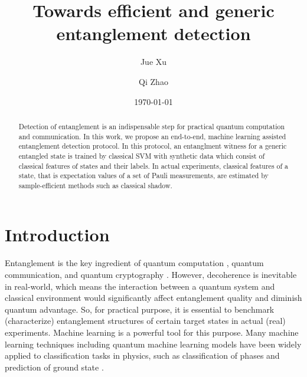 \documentclass[
reprint,
aps,
pra,
floatfix,
]{revtex4-2}
\theoremstyle{plain}
\theoremstyle{definition}
\begin{document}
\title{Towards efficient and generic entanglement detection}
\author{Jue Xu}
\author{Qi Zhao}
\date{\today}
\begin{abstract}
	Detection of entanglement is an indispensable step for practical quantum computation and communication.
	In this work, we propose an end-to-end, machine learning assisted entanglement detection protocol.
	In this protocol, an entanglment witness for a generic entangled state is trained by classical SVM with synthetic data which consist of classical features of states and their labels. 
	In actual experiments, classical features of a state, that is expectation values of a set of  Pauli measurements, are estimated by sample-efficient methods such as classical shadow.
\end{abstract}

\maketitle

\section{Introduction}
Entanglement \cite{horodeckiQuantumEntanglement2009} is the key ingredient of quantum computation \cite{briegelMeasurementbasedQuantumComputation2009}, quantum communication, and quantum cryptography \cite{xuSecureQuantumKey2020}.
However, decoherence is inevitable in real-world, which means the interaction between a quantum system and classical environment would significantly affect entanglement quality and diminish quantum advantage. 
So, for practical purpose, it is essential to benchmark (characterize) entanglement structures of certain target states in actual (real) experiments.
Machine learning is a powerful tool for this purpose. 
Many machine learning techniques including quantum machine learning models \cite{congQuantumConvolutionalNeural2019} have been widely applied to classification tasks in physics, such as classification of phases and prediction of ground state \cite{carrasquillaMachineLearningPhases2017} \cite{huangProvablyEfficientMachine2022}.
\end{document}
